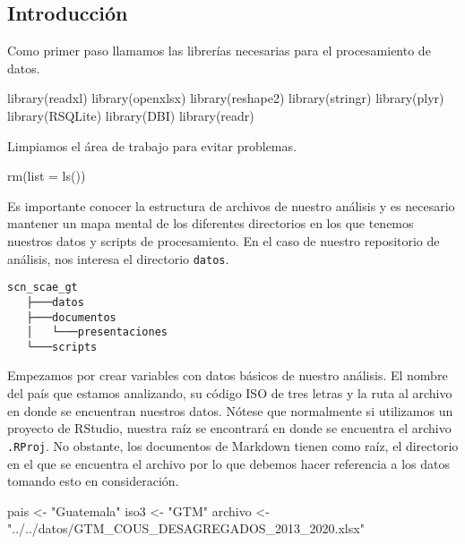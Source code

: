 \documentclass[
]{article}
\newenvironment{Shaded}{\begin{snugshade}}{\end{snugshade}}
\newcommand{\AttributeTok}[1]{\textcolor[rgb]{0.77,0.63,0.00}{#1}}
\newcommand{\FunctionTok}[1]{\textcolor[rgb]{0.00,0.00,0.00}{#1}}
\newcommand{\NormalTok}[1]{#1}
\newcommand{\OtherTok}[1]{\textcolor[rgb]{0.56,0.35,0.01}{#1}}
\newcommand{\StringTok}[1]{\textcolor[rgb]{0.31,0.60,0.02}{#1}}
\begin{document}
\hypertarget{introducciuxf3n}{%
\subsection{Introducción}\label{introducciuxf3n}}

Como primer paso llamamos las librerías necesarias para el procesamiento
de datos.

\begin{Shaded}
\begin{Highlighting}[]
\FunctionTok{library}\NormalTok{(readxl)}
\FunctionTok{library}\NormalTok{(openxlsx)}
\FunctionTok{library}\NormalTok{(reshape2)}
\FunctionTok{library}\NormalTok{(stringr)}
\FunctionTok{library}\NormalTok{(plyr)}
\FunctionTok{library}\NormalTok{(RSQLite)}
\FunctionTok{library}\NormalTok{(DBI)}
\FunctionTok{library}\NormalTok{(readr)}
\end{Highlighting}
\end{Shaded}

Limpiamos el área de trabajo para evitar problemas.

\begin{Shaded}
\begin{Highlighting}[]
\FunctionTok{rm}\NormalTok{(}\AttributeTok{list =} \FunctionTok{ls}\NormalTok{())}
\end{Highlighting}
\end{Shaded}

Es importante conocer la estructura de archivos de nuestro análisis y es
necesario mantener un mapa mental de los diferentes directorios en los
que tenemos nuestros datos y scripts de procesamiento. En el caso de
nuestro repositorio de análisis, nos interesa el directorio
\texttt{datos}.

\begin{verbatim}
scn_scae_gt
   ├───datos
   ├───documentos
   │   └───presentaciones
   └───scripts
\end{verbatim}

Empezamos por crear variables con datos básicos de nuestro análisis. El
nombre del país que estamos analizando, su código ISO de tres letras y
la ruta al archivo en donde se encuentran nuestros datos. Nótese que
normalmente si utilizamos un proyecto de RStudio, nuestra raíz se
encontrará en donde se encuentra el archivo \texttt{.RProj}. No
obstante, los documentos de Markdown tienen como raíz, el directorio en
el que se encuentra el archivo por lo que debemos hacer referencia a los
datos tomando esto en consideración.

\begin{Shaded}
\begin{Highlighting}[]
\NormalTok{pais }\OtherTok{\textless{}{-}} \StringTok{"Guatemala"}
\NormalTok{iso3 }\OtherTok{\textless{}{-}} \StringTok{"GTM"}
\NormalTok{archivo }\OtherTok{\textless{}{-}} \StringTok{"../../datos/GTM\_COUS\_DESAGREGADOS\_2013\_2020.xlsx"}
\end{Highlighting}
\end{Shaded}
\end{document}
